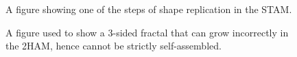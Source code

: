 \documentclass[12pt]{article}
\makeatletter
\newcommand\nocaption[1]{\newline\footnotesize\sffamily #1}
\newcommand\sectionsubtitle[1]{\def\@sectionsubtitle{#1}}
\makeatother
\begin{document}
\begin{figure}[ht]
  \centering
  \nocaption{A figure showing one of the steps of shape replication in the STAM.}
  \label{fig:self-assembly-1}
\end{figure}

\begin{figure}
  \centering
  \nocaption{A figure used to show a 3-sided fractal that can grow incorrectly in the 2HAM, hence cannot be strictly self-assembled.}
  \label{fig:self-assembly-2}
\end{figure}

\clearpage
\sectionsubtitle{}
\thispagestyle{plain}
\printbibliography
\end{document}
